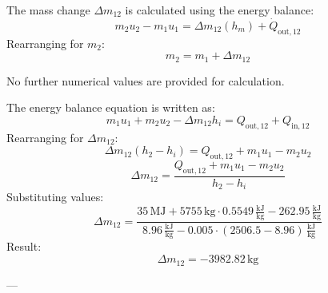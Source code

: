The mass change \(\Delta m_{12}\) is calculated using the energy balance:  
\[
m_2 u_2 - m_1 u_1 = \Delta m_{12}(h_m) + \dot{Q}_{\text{out},12}
\]  
Rearranging for \( m_2 \):  
\[
m_2 = m_1 + \Delta m_{12}
\]  

No further numerical values are provided for calculation.

The energy balance equation is written as:  
\[
m_1 u_1 + m_2 u_2 - \Delta m_{12} h_i = Q_{\text{out},12} + Q_{\text{in},12}
\]  
Rearranging for \( \Delta m_{12} \):  
\[
\Delta m_{12} (h_2 - h_i) = Q_{\text{out},12} + m_1 u_1 - m_2 u_2
\]  
\[
\Delta m_{12} = \frac{Q_{\text{out},12} + m_1 u_1 - m_2 u_2}{h_2 - h_i}
\]  
Substituting values:  
\[
\Delta m_{12} = \frac{35 \, \text{MJ} + 5755 \, \text{kg} \cdot 0.5549 \, \frac{\text{kJ}}{\text{kg}} - 262.95 \, \frac{\text{kJ}}{\text{kg}}}{8.96 \, \frac{\text{kJ}}{\text{kg}} - 0.005 \cdot (2506.5 - 8.96) \, \frac{\text{kJ}}{\text{kg}}}
\]  
Result:  
\[
\Delta m_{12} = -3982.82 \, \text{kg}
\]  

---